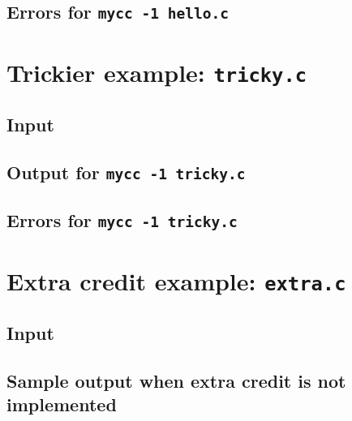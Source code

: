 \documentclass{article}
\begin{document}


\subsection{Errors for {\tt mycc -1 hello.c}}




\section{Trickier example: {\tt tricky.c}}

\subsection{Input}



\subsection{Output for {\tt mycc -1 tricky.c}}



\subsection{Errors for {\tt mycc -1 tricky.c}}




\section{Extra credit example: {\tt extra.c}}

\subsection{Input}



\subsection{Sample output when extra credit is not implemented}
\end{document}
